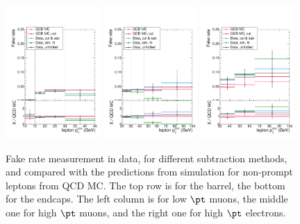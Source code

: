\begin{figure}[htb]
\includegraphics[width=0.32\textwidth]{plots_fakerate/measurement/fr_MuX_CombLow_eta_12_24_comp} 
\includegraphics[width=0.32\textwidth]{plots_fakerate/measurement/fr_MuX_CombHigh_eta_12_24_comp}
\includegraphics[width=0.32\textwidth]{plots_fakerate/measurement/fr_Ele17_eta_15_25_comp}
        \caption{Fake rate measurement in data, for different subtraction methods, and compared with the predictions from simulation for non-prompt leptons from QCD MC. The top row is for the barrel, the bottom for the endcaps. The left column is for low $\pt$ muons, the middle one for high $\pt$ muons, and the right one for high $\pt$ electrons.}
        \label{fig:frmeas-qcd-data-methods}
\end{figure}

